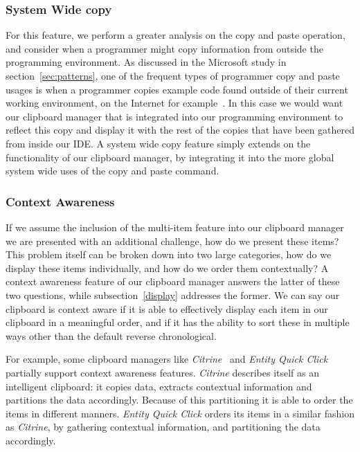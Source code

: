 \documentclass{acm_proc_article-sp}
\begin{document}
\subsubsection{System Wide copy}\label{systemCopy}
For this feature, we perform a greater analysis on the copy and paste operation, and consider when a programmer might copy information from outside the programming environment. As discussed in the Microsoft study in section~\ref{sec:patterns}, one of the frequent types of programmer copy and paste usages is when a programmer copies example code found outside of their current working environment, on the Internet for example~\cite{devWorkHabits}. In this case we would want our clipboard manager that is integrated into our programming environment to reflect this copy and display it with the rest of the copies that have been gathered from inside our IDE. A system wide copy feature simply extends on the functionality of our clipboard manager, by integrating it into the more global system wide uses of the copy and paste command.

\subsubsection{Context Awareness}\label{context}
If we assume the inclusion of the multi-item feature into our clipboard manager we are presented with an additional challenge, how do we present these items? This problem itself can be broken down into two large categories, how do we display these items individually, and how do we order them contextually? A context awareness feature of our clipboard manager answers the latter of these two questions, while subsection~\ref{display} addresses the former. We can say our clipboard is context aware if it is able to effectively display each item in our clipboard in a meaningful order, and if it has the ability to sort these in multiple ways other than the default reverse chronological.
    
For example, some clipboard managers like \textit{Citrine}~\cite{Citrine} and \textit{Entity Quick Click}~\cite{Entity} partially support context awareness features. \textit{Citrine} describes itself as an intelligent clipboard: it copies data, extracts contextual information and partitions the data accordingly. Because of this partitioning it is able to order the items in different manners. \textit{Entity Quick Click} orders its items in a similar fashion as \textit{Citrine}, by gathering contextual information, and partitioning the data accordingly.
\end{document}
